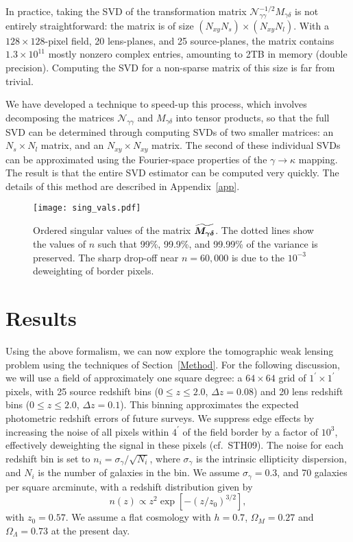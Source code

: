 In practice, taking the SVD of the transformation matrix 
$\mathcal{N}_{\gamma\gamma}^{-1/2}M_{\gamma\delta}$
is not entirely straightforward: the matrix is of size 
$(N_{xy}N_s) \times (N_{xy}N_l)$.
With a $128 \times 128$-pixel field, 20 lens-planes, and 25 source-planes,
the matrix contains $1.3\times 10^{11}$ mostly nonzero complex entries, 
amounting to 2TB in memory (double precision).  
Computing the SVD for a non-sparse matrix of this size is far from trivial.

We have developed a technique to speed-up this process, which involves decomposing
the matrices $\mathcal{N}_{\gamma\gamma}$ and $M_{\gamma\delta}$ into tensor
products, so that the full SVD can be determined through computing SVDs of
two smaller matrices: an $N_s\times N_l$ matrix, 
and an $N_{xy}\times N_{xy}$ matrix.
The second of these individual SVDs can be approximated using the
Fourier-space properties of the $\gamma\to\kappa$ mapping.  The result is
that the entire SVD estimator can be computed very quickly.  The details
of this method are described in Appendix~\ref{app}.

\begin{figure*}[t] 
 \centering
 \texttt{[image: sing\_vals.pdf]}
 \caption{
   Ordered singular values of the matrix
   $\boldsymbol{\widetilde{M_{\gamma\delta}}}$.
   The dotted lines show the values of $n$ 
   such that 99\%, 99.9\%, and 99.99\% of the variance is preserved.
   The sharp drop-off near $n=60,000$ is due to the $10^{-3}$ 
   deweighting of border pixels.
   \label{fig_sing_vals}}
\end{figure*}

\section{Results}
\label{Results}
\label{Parameters}
Using the above formalism, we can now explore the
tomographic weak lensing problem using the 
techniques of Section~\ref{Method}.
For the following discussion, we will use a field of approximately 
one square degree: a $64 \times 64$ grid of
$1^\prime \times 1^\prime$ pixels, with 25 source redshift
bins ($0\le z\le 2.0$, $\Delta z = 0.08$) and 20 lens redshift bins
($0\le z\le 2.0$, $\Delta z = 0.1$).  This binning approximates the 
expected photometric redshift errors of future surveys.
We suppress edge effects by increasing
the noise of all pixels within $4^\prime$ of the field border
by a factor of $10^3$, effectively
deweighting the signal in these pixels (cf.\ STH09).  The noise
for each redshift bin is set to $n_i = \sigma_\gamma/\sqrt{N_i}$, where 
$\sigma_\gamma$ is the intrinsic ellipticity dispersion, and
$N_i$ is the number of galaxies in the bin.  We assume $\sigma_\gamma = 0.3$,
and 70 galaxies per square arcminute, with a redshift distribution given by
\begin{equation}
  \label{gal_z_dist}
  n(z) \propto z^2\exp{\left[-(z/z_0)^{3/2}\right]},
\end{equation}
with $z_0 = 0.57$.  We assume a flat cosmology with 
$h=0.7$, $\Omega_M = 0.27$  and $\Omega_\Lambda = 0.73$ at the present day.

